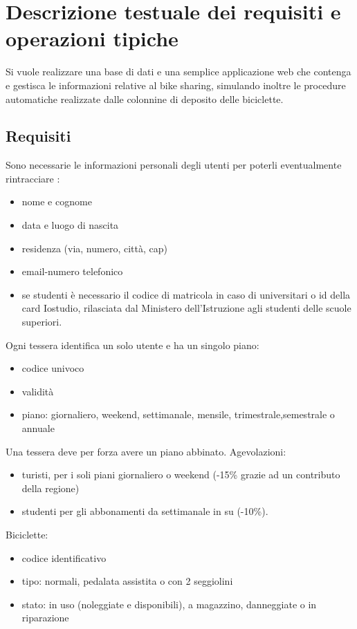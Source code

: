 \documentclass[a4paper,twoside]{article}
\begin{document}
\section{Descrizione testuale dei requisiti e operazioni tipiche}
Si vuole realizzare una base di dati e una semplice applicazione web che contenga e gestisca le informazioni relative al
bike sharing, simulando inoltre le procedure automatiche realizzate dalle colonnine di deposito delle biciclette.


\subsection{Requisiti}
Sono necessarie le informazioni personali degli utenti per poterli eventualmente rintracciare :
\begin{itemize}
 \item nome e cognome
 \item data e luogo di nascita
 \item residenza (via, numero, città, cap)
 \item email-numero telefonico
 \item se studenti è necessario il codice di matricola in caso di universitari o id della card Iostudio, rilasciata dal Ministero dell'Istruzione agli studenti delle scuole superiori. 
\end{itemize}
Ogni tessera identifica un solo utente e ha un singolo piano:
\begin{itemize}%
 \item codice univoco
 \item validità
 \item piano: giornaliero, weekend, settimanale, mensile, trimestrale,semestrale o annuale
\end{itemize}
Una tessera deve per forza avere un piano abbinato.\newline
Agevolazioni:
\begin{itemize}
 \item turisti, per i soli piani giornaliero o weekend (-15\% grazie ad un contributo della regione)
 \item studenti per gli abbonamenti da settimanale in su (-10\%).
\end{itemize}
Biciclette:
\begin{itemize}
 \item codice identificativo
 \item tipo: normali, pedalata assistita o con 2 seggiolini
 \item stato: in uso (noleggiate e disponibili), a magazzino, danneggiate o in riparazione
\end{itemize}
\end{document}
